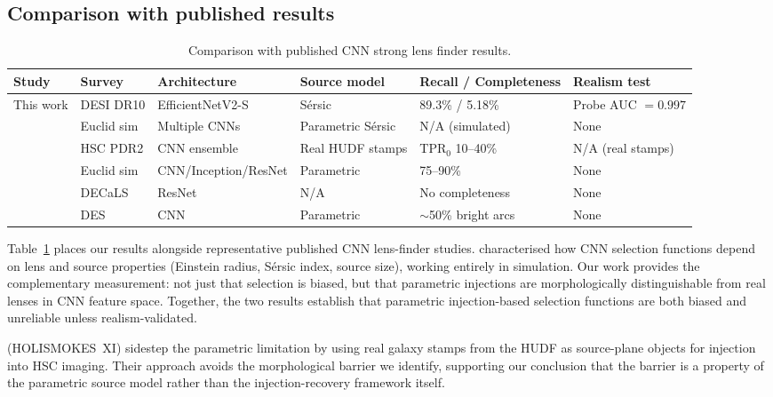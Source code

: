 \documentclass[fleqn,usenatbib]{rasti}
\begin{document}
\subsection{Comparison with published results}

\begin{table}
\caption{Comparison with published CNN strong lens finder results.}
\label{tab:published}
\centering
\begin{tabular}{llllll}
\toprule
Study & Survey & Architecture & Source model & Recall / Completeness & Realism test \\
\midrule
This work & DESI DR10 & EfficientNetV2-S & S\'{e}rsic & 89.3\% / 5.18\% & Probe AUC $= 0.997$ \\
\citet{Herle2024} & Euclid sim & Multiple CNNs & Parametric S\'{e}rsic & N/A (simulated) & None \\
\citet{Canameras2024} & HSC PDR2 & CNN ensemble & Real HUDF stamps & TPR$_0$ 10--40\% & N/A (real stamps) \\
\citet{EuclidPrepXXXIII} & Euclid sim & CNN/Inception/ResNet & Parametric & 75--90\% & None \\
\citet{Huang2020} & DECaLS & ResNet & N/A & No completeness & None \\
\citet{Jacobs2019} & DES & CNN & Parametric & $\sim$50\% bright arcs & None \\
\bottomrule
\end{tabular}
\end{table}

Table~\ref{tab:published} places our results alongside representative published CNN lens-finder studies.  \citet{Herle2024} characterised how CNN selection functions depend on lens and source properties (Einstein radius, S\'{e}rsic index, source size), working entirely in simulation.  Our work provides the complementary measurement: not just that selection is biased, but that parametric injections are morphologically distinguishable from real lenses in CNN feature space.  Together, the two results establish that parametric injection-based selection functions are both biased and unreliable unless realism-validated.

\citet{Canameras2024} (HOLISMOKES~XI) sidestep the parametric limitation by using real galaxy stamps from the HUDF as source-plane objects for injection into HSC imaging.  Their approach avoids the morphological barrier we identify, supporting our conclusion that the barrier is a property of the parametric source model rather than the injection-recovery framework itself.
\end{document}
